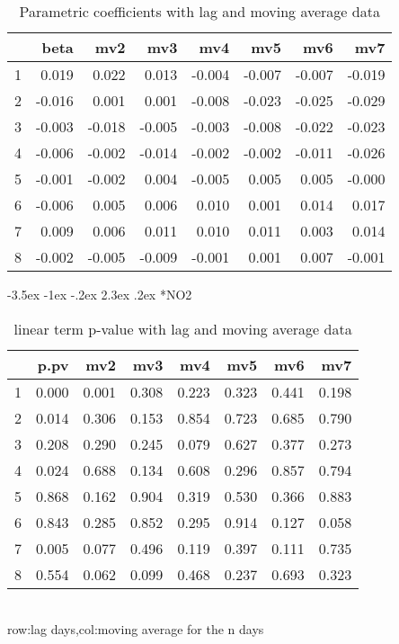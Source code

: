 \documentclass[a4paper, 12pt]{article}
\makeatletter
\def\large{\fontsize{14}{20}\selectfont}
\renewcommand\subsection{\@startsection {subsection}{1}{\z@}%
                                   {-3.5ex \@plus -1ex \@minus -.2ex}%
                                   {2.3ex \@plus.2ex}%
                                   {\centering\normalfont\large\bfseries}}
\makeatother
\begin{document}
\begin{table}[h]
\centering
\caption{Parametric coefficients with lag and moving average data}
\begin{tabular}{rrrrrrrr}
  \hline
 & beta & mv2 & mv3 & mv4 & mv5 & mv6 & mv7 \\
  \hline
1 & 0.019 & 0.022 & 0.013 & -0.004 & -0.007 & -0.007 & -0.019 \\
  2 & -0.016 & 0.001 & 0.001 & -0.008 & -0.023 & -0.025 & -0.029 \\
  3 & -0.003 & -0.018 & -0.005 & -0.003 & -0.008 & -0.022 & -0.023 \\
  4 & -0.006 & -0.002 & -0.014 & -0.002 & -0.002 & -0.011 & -0.026 \\
  5 & -0.001 & -0.002 & 0.004 & -0.005 & 0.005 & 0.005 & -0.000 \\
  6 & -0.006 & 0.005 & 0.006 & 0.010 & 0.001 & 0.014 & 0.017 \\
  7 & 0.009 & 0.006 & 0.011 & 0.010 & 0.011 & 0.003 & 0.014 \\
  8 & -0.002 & -0.005 & -0.009 & -0.001 & 0.001 & 0.007 & -0.001 \\
   \hline
\end{tabular}
\end{table}
\clearpage
\subsection*{NO2}
\begin{table}[h]
\centering
\caption{linear term p-value with lag and moving average data}
\begin{tabular}{rrrrrrrr}
  \hline
 & p.pv & mv2 & mv3 & mv4 & mv5 & mv6 & mv7 \\
  \hline
1 & 0.000 & 0.001 & 0.308 & 0.223 & 0.323 & 0.441 & 0.198 \\
  2 & 0.014 & 0.306 & 0.153 & 0.854 & 0.723 & 0.685 & 0.790 \\
  3 & 0.208 & 0.290 & 0.245 & 0.079 & 0.627 & 0.377 & 0.273 \\
  4 & 0.024 & 0.688 & 0.134 & 0.608 & 0.296 & 0.857 & 0.794 \\
  5 & 0.868 & 0.162 & 0.904 & 0.319 & 0.530 & 0.366 & 0.883 \\
  6 & 0.843 & 0.285 & 0.852 & 0.295 & 0.914 & 0.127 & 0.058 \\
  7 & 0.005 & 0.077 & 0.496 & 0.119 & 0.397 & 0.111 & 0.735 \\
  8 & 0.554 & 0.062 & 0.099 & 0.468 & 0.237 & 0.693 & 0.323 \\
   \hline
\end{tabular}
\\row:lag days,col:moving average for the n days
\end{table}
\end{document}
